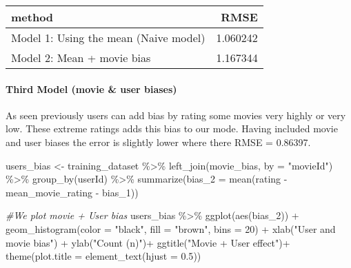 \documentclass[
]{article}
\newenvironment{Shaded}{\begin{snugshade}}{\end{snugshade}}
\newcommand{\AttributeTok}[1]{\textcolor[rgb]{0.77,0.63,0.00}{#1}}
\newcommand{\CommentTok}[1]{\textcolor[rgb]{0.56,0.35,0.01}{\textit{#1}}}
\newcommand{\DecValTok}[1]{\textcolor[rgb]{0.00,0.00,0.81}{#1}}
\newcommand{\FloatTok}[1]{\textcolor[rgb]{0.00,0.00,0.81}{#1}}
\newcommand{\FunctionTok}[1]{\textcolor[rgb]{0.00,0.00,0.00}{#1}}
\newcommand{\NormalTok}[1]{#1}
\newcommand{\OtherTok}[1]{\textcolor[rgb]{0.56,0.35,0.01}{#1}}
\newcommand{\SpecialCharTok}[1]{\textcolor[rgb]{0.00,0.00,0.00}{#1}}
\newcommand{\StringTok}[1]{\textcolor[rgb]{0.31,0.60,0.02}{#1}}
\begin{document}
\begin{longtable}[]{@{}lr@{}}
\toprule
method & RMSE \\
\midrule
\endhead
Model 1: Using the mean (Naive model) & 1.060242 \\
Model 2: Mean + movie bias & 1.167344 \\
\bottomrule
\end{longtable}

\hypertarget{third-model-movie-user-biases}{%
\paragraph{Third Model (movie \& user
biases)}\label{third-model-movie-user-biases}}

As seen previously users can add bias by rating some movies very highly
or very low. These extreme ratings adds this bias to our mode. Having
included movie and user biases the error is slightly lower where there
RMSE = 0.86397.

\begin{Shaded}
\begin{Highlighting}[]
\NormalTok{users\_bias }\OtherTok{\textless{}{-}}\NormalTok{ training\_dataset }\SpecialCharTok{\%\textgreater{}\%}
  \FunctionTok{left\_join}\NormalTok{(movie\_bias, }\AttributeTok{by =} \StringTok{"movieId"}\NormalTok{) }\SpecialCharTok{\%\textgreater{}\%}
  \FunctionTok{group\_by}\NormalTok{(userId) }\SpecialCharTok{\%\textgreater{}\%}
  \FunctionTok{summarize}\NormalTok{(}\AttributeTok{bias\_2 =} \FunctionTok{mean}\NormalTok{(rating }\SpecialCharTok{{-}}\NormalTok{ mean\_movie\_rating }\SpecialCharTok{{-}}\NormalTok{ bias\_1))}

\CommentTok{\#We plot movie + User bias}
\NormalTok{users\_bias }\SpecialCharTok{\%\textgreater{}\%} \FunctionTok{ggplot}\NormalTok{(}\FunctionTok{aes}\NormalTok{(bias\_2)) }\SpecialCharTok{+}
  \FunctionTok{geom\_histogram}\NormalTok{(}\AttributeTok{color =} \StringTok{"black"}\NormalTok{, }\AttributeTok{fill =} \StringTok{"brown"}\NormalTok{, }\AttributeTok{bins =} \DecValTok{20}\NormalTok{) }\SpecialCharTok{+}
  \FunctionTok{xlab}\NormalTok{(}\StringTok{"User and movie bias"}\NormalTok{) }\SpecialCharTok{+}
  \FunctionTok{ylab}\NormalTok{(}\StringTok{"Count (n)"}\NormalTok{)}\SpecialCharTok{+}
  \FunctionTok{ggtitle}\NormalTok{(}\StringTok{"Movie + User effect"}\NormalTok{)}\SpecialCharTok{+}
  \FunctionTok{theme}\NormalTok{(}\AttributeTok{plot.title =} \FunctionTok{element\_text}\NormalTok{(}\AttributeTok{hjust =} \FloatTok{0.5}\NormalTok{))}
\end{Highlighting}
\end{Shaded}
\end{document}
